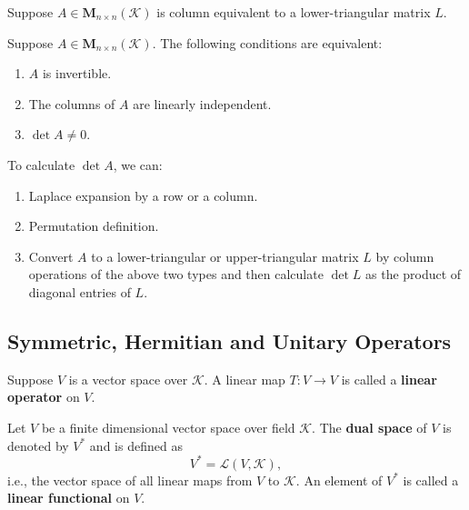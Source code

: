 \documentclass{ctexart}
\newcommand{\M}{\mathbf{M}}
\begin{document}
    \begin{mythm}
        Suppose $A\in \M_{n \times n}(\mathcal{K})$ is column equivalent to a lower-triangular matrix $L$.
    \end{mythm}
    \begin{mythm}
        Suppose $A\in \M_{n \times n}(\mathcal{K})$. The following conditions are equivalent:
        \begin{enumerate}
            \item $A$ is invertible.
            \item The columns of $A$ are linearly independent.
            \item $\det A \neq 0$.
        \end{enumerate}
    \end{mythm}
    \begin{myrmk}
        To calculate $\det A$, we can:
        \begin{enumerate}
            \item Laplace expansion by a row or a column.
            \item Permutation definition.
            \item Convert $A$ to a lower-triangular or upper-triangular matrix $L$ by column operations of the above two types and then calculate $\det L$ as the product of diagonal entries of $L$.
        \end{enumerate}
    \end{myrmk}

    \subsection{Symmetric, Hermitian and Unitary Operators}
    \begin{mydef}
        Suppose $V$ is a vector space over $\mathcal{K}$. A linear map $T: V \to V$ is called a \textbf{linear operator} on $V$. 
    \end{mydef}
    \begin{mydef}
    Let $V$ be a finite dimensional vector space over field $\mathcal{K}$. The \textbf{dual space} of $V$ is denoted by $V^*$ and is defined as
    \[
    V^*=\mathcal{L}(V,\mathcal{K}),
    \]
    i.e., the vector space of all linear maps from $V$ to $\mathcal{K}$. An element of $V^*$ is called a \textbf{linear functional} on $V$.
    \end{mydef}
\end{document}
